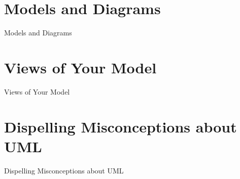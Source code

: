 \documentclass{beamer}
\begin{document}
	\section{Models and Diagrams}
		\begin{frame}{Models and Diagrams}
		\end{frame}
	\section{Views of Your Model}
		\begin{frame}{Views of Your Model}
			
		\end{frame}
	\section{Dispelling Misconceptions about UML}
		\begin{frame}{Dispelling Misconceptions about UML}
			
		\end{frame}
\end{document}
